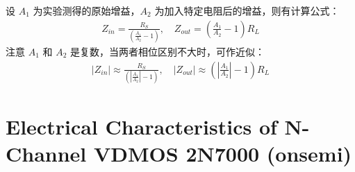 \documentclass[UTF8]{article}
\begin{document}
\noindent
设 $A_1$ 为实验测得的原始增益，$A_2$ 为加入特定电阻后的增益，则有计算公式：
\begin{gather}
Z_{in} = \frac{R_S}{\left(\frac{A_1}{A_2} - 1\right)},\quad 
Z_{out} = \left(\frac{A_1}{A_2} - 1\right) R_L
\end{gather}
注意 $A_1$ 和 $A_2$ 是复数，当两者相位区别不大时，可作近似：
\begin{gather}
|Z_{in}| \approx \frac{R_S}{\left(\left|\frac{A_1}{A_2}\right| - 1\right)},\quad 
|Z_{out}| \approx \left(\left|\frac{A_1}{A_2}\right| - 1\right) R_L
\end{gather}



\section{Electrical Characteristics of N-Channel VDMOS 2N7000 (onsemi)}

\end{document}
